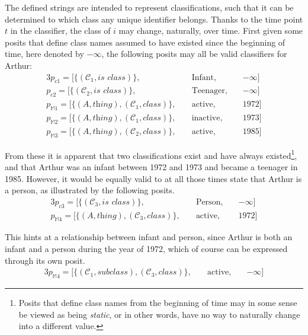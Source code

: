 \documentclass[sfsidenotes,nobib,twoside,symmetric]{tufte-handout}
\begin{document}
The defined strings are intended to represent classifications, such that it can be determined to which class any unique identifier belongs. Thanks to the time point $t$ in the classifier, the class of $i$ may change, naturally, over time. First given some posits that define class names assumed to have existed since the beginning of time, here denoted by $-\infty$, the following posits may all be valid classifiers for Arthur: 
\begin{alignat*}{3}
p_{c1} = [\{(\mathcal{C}_1, \textit{is class})\},\;&& \textrm{Infant},\;&& -\infty] \\
p_{c2} = [\{(\mathcal{C}_2, \textit{is class})\},\;&& \textrm{Teenager},\;&& -\infty] \\
p_{\mathbb{M}1} = [\{(A, \textit{thing}), (\mathcal{C}_1, \textit{class})\},\;&& \textrm{active},\;&& \textrm{1972}] \\
p_{\mathbb{M}2} = [\{(A, \textit{thing}), (\mathcal{C}_1, \textit{class})\},\;&& \textrm{inactive},\;&& \textrm{1973}] \\
p_{\mathbb{M}3} = [\{(A, \textit{thing}), (\mathcal{C}_2, \textit{class})\},\;&& \textrm{active},\;&& \textrm{1985}] 
\end{alignat*}

From these it is apparent that two classifications exist and have always existed\footnote{Posits that define class names from the beginning of time may in some sense be viewed as being \emph{static}, or in other words, have no way to naturally change into a different value.}, and that Arthur was an infant between 1972 and 1973 and became a teenager in 1985. However, it would be equally valid to at all those times state that Arthur is a person, as illustrated by the following posits. 
\begin{alignat*}{3}
p_{c3} = [\{(\mathcal{C}_3, \textit{is class})\},\;&& \textrm{Person},\;&& -\infty] \\
p_{\mathbb{M}4} = [\{(A, \textit{thing}), (\mathcal{C}_3, \textit{class})\},\;&& \textrm{active},\;&& \textrm{1972}] 
\end{alignat*}

This hints at a relationship between infant and person, since Arthur is both an infant and a person during the year of 1972, which of course can be expressed through its own posit.
\begin{alignat*}{3}
p_{\mathbb{M}4} = [\{(\mathcal{C}_1, \textit{subclass}), (\mathcal{C}_3, \textit{class})\},\;&& \textrm{active},\;&& -\infty] 
\end{alignat*}
\end{document}
